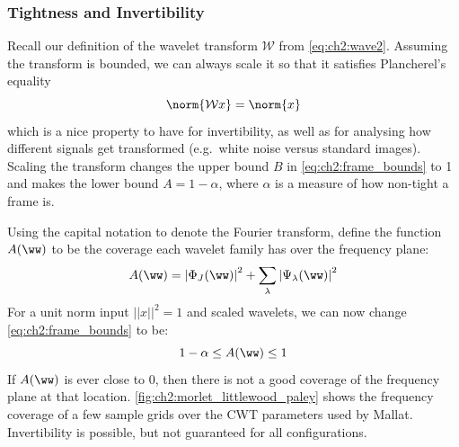 \subsubsection{Tightness and Invertibility}
Recall our definition of the wavelet transform $\mathcal{W}$ from \eqref{eq:ch2:wave2}.
Assuming the transform is bounded, we can always scale it so that it satisfies
Plancherel's equality
\begin{equation}
  \norm{\mathcal{W}x} = \norm{x}
\end{equation}
which is a nice property to have for invertibility, as well as for analysing
how different signals get transformed (e.g.\ white noise versus standard
images). Scaling the transform changes the upper bound $B$ in \eqref{eq:ch2:frame_bounds}
to 1 and makes the lower bound $A = 1-\alpha$, where $\alpha$ is a measure of how
non-tight a frame is.

Using the capital notation to denote the Fourier transform, define the function
$A(\ww)$ to be the coverage each wavelet family has over the frequency plane:
\begin{equation}
  A(\ww) = {|\Phi_J(\ww)|}^2 + \sum_{\lambda} {|\Psi_{\lambda}(\ww)|}^2
  \label{eq:ch2:lwood_paley}
\end{equation}
For a unit norm input $||x||^2 = 1$ and scaled wavelets, we can now change
\eqref{eq:ch2:frame_bounds} to be:
\begin{equation}
  1-\alpha \leq A(\ww) \leq 1
\end{equation}
  If $A(\ww)$ is ever close to 0, then there is not a good coverage of the frequency plane
  at that location.
  \autoref{fig:ch2:morlet_littlewood_paley} shows the frequency coverage of a few
  sample grids over the CWT parameters used by Mallat. Invertibility is possible, but not
  guaranteed for all configurations.

  \begin{figure}
    \centering
      \label{fig:ch2:morlet_littlewood_paley}
  \end{figure}

